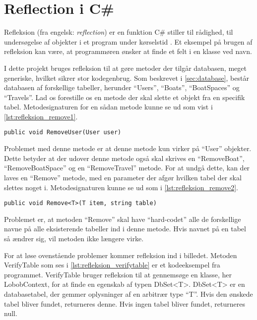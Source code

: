\section{Reflection i C\#}
\label{sec:refleksion}

Refleksion (fra engelsk: \textit{reflection}) er en funktion C\# stiller til rådighed, til undersøgelse af objekter i et program under kørselstid \cite{michaelis2012essential}. Et eksempel på brugen af refleksion kan være, at programmøren ønsker at finde et felt i en klasse ved navn.

I dette projekt bruges refleksion til at gøre metoder der tilgår databasen, meget generiske, hvilket sikrer stor kodegenbrug. Som beskrevet i \cref{sec:database}, består databasen af forskellige tabeller, herunder \enquote{Users}, \enquote{Boats}, \enquote{BoatSpaces} og \enquote{Travels}. Lad os forestille os en metode der skal slette et objekt fra en specifik tabel. Metodesignaturen for en sådan metode kunne se ud som vist i \cref{lst:refleksion_remove1}.


\begin{lstlisting}[label=lst:refleksion_remove1]
public void RemoveUser(User user)
\end{lstlisting}

Problemet med denne metode er at denne metode kun virker på \enquote{User} objekter. Dette betyder at der udover denne metode også skal skrives en \enquote{RemoveBoat}, \enquote{RemoveBoatSpace} og en \enquote{RemoveTravel} metode. For at undgå dette, kan der laves en \enquote{Remove} metode, med en parameter der afgør hvilken tabel der skal slettes noget i. Metodesignaturen kunne se ud som i \cref{lst:refleksion_remove2}.


\begin{lstlisting}[label=lst:refleksion_remove2]
public void Remove<T>(T item, string table)
\end{lstlisting}

Problemet er, at metoden \enquote{Remove} skal have \enquote{hard-codet} alle de forskellige navne på alle eksisterende tabeller ind i denne metode. Hvis navnet på en tabel så ændrer sig, vil metoden ikke længere virke.

For at løse ovenstående problemer kommer refleksion ind i billedet. Metoden VerifyTable som ses i \cref{lst:refleksion_verifytable} er et kodeeksempel fra programmet. VerifyTable bruger refleksion til at gennemsøge en klasse, her LobobContext, for at finde en egenskab af typen DbSet<T>. DbSet<T> er en databasetabel, der gemmer oplysninger af en arbitrær type \enquote{T}. Hvis den ønskede tabel bliver fundet, returneres denne. Hvis ingen tabel bliver fundet, returneres null.

